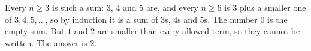 Every $n\ge3$ is such a sum: $3$, $4$ and $5$ are, and every $n\ge6$ is $3$ plus a smaller one of $3,4,5,\dots$, so by induction it is a sum of $3$s, $4$s and $5$s. The number $0$ is the empty sum. But $1$ and $2$ are smaller than every allowed term, so they cannot be written. The answer is $\boxed{2}$.
